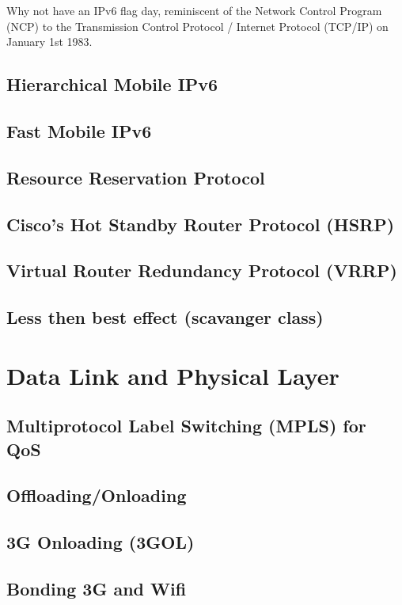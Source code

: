 \documentclass[journal]{IEEEtran}
\begin{document}
Why not have an IPv6 flag day, reminiscent of the Network Control Program (NCP) to the Transmission Control Protocol / Internet Protocol (TCP/IP) on January 1st 1983.
 


\subsection{Hierarchical Mobile IPv6}
\subsection{Fast Mobile IPv6}
\subsection{Resource Reservation Protocol}
\subsection{Cisco's Hot Standby Router Protocol (HSRP)}
\subsection{Virtual Router Redundancy Protocol (VRRP)}
\subsection{Less then best effect (scavanger class)}

\section{Data Link and Physical Layer}
\subsection{ Multiprotocol Label Switching (MPLS) for QoS }
\subsection{ Offloading/Onloading }
\subsection{ 3G Onloading (3GOL) }
\subsection{ Bonding 3G and Wifi }
\end{document}
